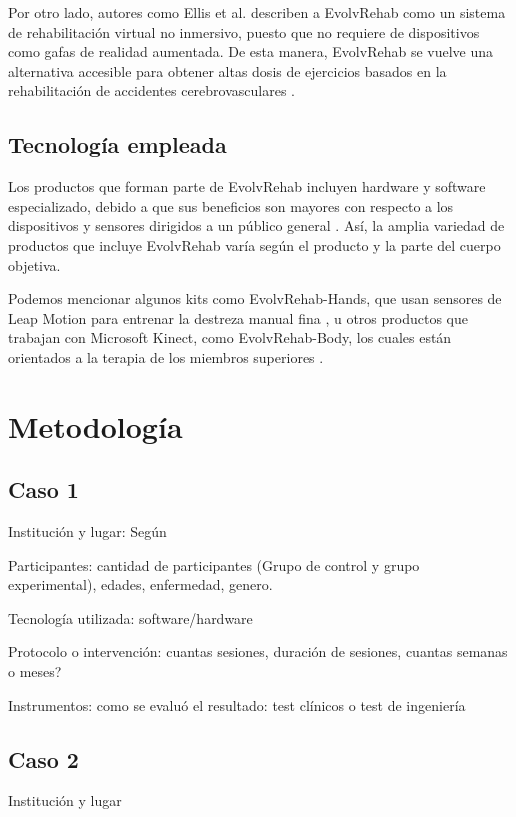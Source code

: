 \documentclass[journal]{IEEEtran}
\begin{document}
Por otro lado, autores como Ellis et al. \cite{ellis2022consideration} describen a EvolvRehab como un sistema de rehabilitación virtual no inmersivo, puesto que no requiere de dispositivos como gafas de realidad aumentada. De esta manera, EvolvRehab se vuelve una alternativa accesible para obtener altas dosis de ejercicios basados en la rehabilitación de accidentes cerebrovasculares \cite{ellis2022consideration, evolvRehab}.

\subsection{Tecnología empleada}
Los productos que forman parte de EvolvRehab incluyen hardware y software especializado, debido a que sus beneficios son mayores con respecto a los dispositivos y sensores dirigidos a un público general \cite{maier2019effect}. Así, la amplia variedad de productos que incluye EvolvRehab varía según el producto y la parte del cuerpo objetiva.

Podemos mencionar algunos kits como EvolvRehab-Hands, que usan sensores de Leap Motion para entrenar la destreza manual fina \cite{evolvRehab}, u otros productos que trabajan con Microsoft Kinect, como EvolvRehab-Body, los cuales están orientados a la terapia de los miembros superiores \cite{ellis2022consideration}.



\section{Metodología}
\subsection{Caso 1}
Institución y lugar: Según 

Participantes: cantidad de participantes (Grupo de control y grupo experimental), edades, enfermedad, genero.

Tecnología utilizada: software/hardware 

Protocolo o intervención: cuantas sesiones, duración de sesiones, cuantas semanas o meses?

Instrumentos: como se evaluó el resultado: test clínicos o test de ingeniería 

\subsection{Caso 2}
Institución y lugar
\end{document}
